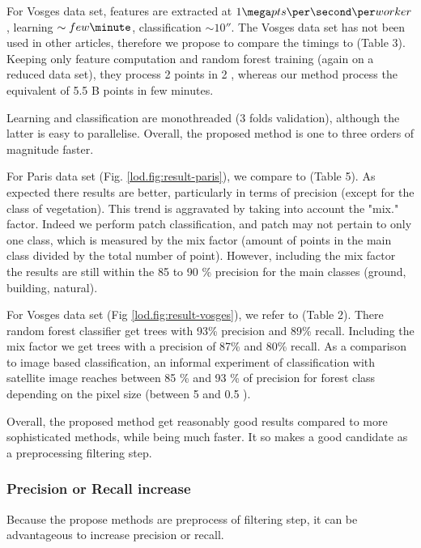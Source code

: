 		  For Vosges data set, features are extracted at $1 \mega pts \per \second \per worker$, learning $\sim few \minute$, classification $\sim 10 \second$.
		  The Vosges data set has not been used in other articles, therefore we propose to compare the timings to \cite{shapovalov2010} (Table 3). Keeping only feature computation and random forest training (again on a reduced data set), they process 2 \mega points in 2 \minute, whereas our method process the equivalent of 5.5 B points in few minutes.
		  
		  
		  Learning and classification are monothreaded (3 folds validation), although the latter is easy to parallelise.
		  Overall, the proposed method is one to three orders of magnitude faster.
		  
		  For Paris data set (Fig. \ref{lod.fig:result-paris}), we compare to \cite{Weinmann2015}(Table 5). As expected there results are better, particularly in terms of precision (except for the class of vegetation). This trend is aggravated by taking into account the "mix." factor.
		  Indeed we perform patch classification, and patch may not pertain to only one class, which is measured by the mix factor (amount of points in the main class divided by the total number of point).
		  However, including the mix factor the results are still within the 85 to 90 \% precision for the main classes (ground, building, natural).
		  
		  For Vosges data set (Fig \ref{lod.fig:result-vosges}), we refer to \cite{shapovalov2010} (Table 2). There random forest classifier get trees with 93\% precision and  89\% recall.
		  Including the mix factor we get trees with a precision of 87\% and 80\% recall.
		  As a comparison to image based classification, an informal experiment of classification with satellite image reaches between 85 \% and 93 \% of precision for forest class depending on the pixel size (between 5 and 0.5 \metre).
		  
		  Overall, the proposed method get reasonably good results compared to more sophisticated methods,
		  while being much faster.
		  It so makes a good candidate as a preprocessing filtering step.
		  
	 \subsubsection{Precision or Recall increase}
	 Because the propose methods are preprocess of filtering step, it can be advantageous to increase precision or recall.
		
